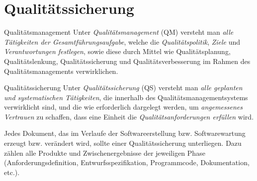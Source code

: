\section{Qualitätssicherung}

\begin{defi}{Qualitätsmanagement}
    Unter \emph{Qualitätsmanagement} (QM) versteht man \emph{alle Tätigkeiten der Gesamtführungsaufgabe}, welche die \emph{Qualitätspolitik}, \emph{Ziele} und \emph{Verantwortungen festlegen}, sowie diese durch Mittel wie Qualitätsplanung, Qualitätslenkung, Qualitätssicherung und Qualitätsverbesserung im Rahmen des Qualitätsmanagements verwirklichen.
\end{defi}

\begin{defi}{Qualitätssicherung}
    Unter \emph{Qualitätssicherung} (QS) versteht man \emph{alle geplanten und systematischen Tätigkeiten}, die innerhalb des Qualitätsmanagementsystems verwirklicht sind, und die wie erforderlich dargelegt werden, um \emph{angemessenes Vertrauen} zu schaffen, dass eine Einheit die \emph{Qualitätsanforderungen erfüllen} wird.

    Jedes Dokument, das im Verlaufe der Softwareerstellung bzw. Softwarewartung erzeugt bzw. verändert wird, sollte einer Qualitätssicherung unterliegen.
    Dazu zählen alle Produkte und Zwischenergebnisse der jeweiligen Phase (Anforderungsdefinition, Entwurfsspezifikation, Programmcode, Dokumentation, etc.).
\end{defi}


